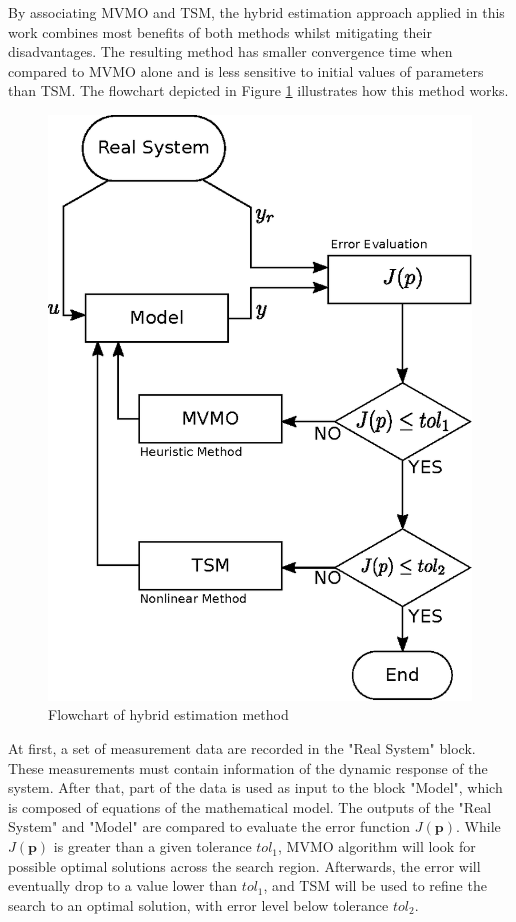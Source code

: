By associating MVMO and TSM, the hybrid estimation approach applied in this work combines most benefits of both methods whilst mitigating their disadvantages. The resulting method has smaller convergence time when compared to MVMO alone and is less sensitive to initial values of parameters than TSM. The flowchart depicted in Figure \ref{fig: flowchart} illustrates how this method works.

\begin{figure}[h]
	\caption{Flowchart of hybrid estimation method}
	\begin{center}
		\includegraphics[scale=0.7]{Images/Flowchart.eps}
	\end{center}
	\label{fig: flowchart}
\end{figure}

At first, a set of measurement data are recorded in the "Real System" block. These measurements must contain information of the dynamic response of the system. After that, part of the data is used as input to the block "Model", which is composed of equations of the mathematical model. The outputs of the "Real System" and "Model" are compared to evaluate the error function $J(\mathbf{p})$. While $J(\mathbf{p})$ is greater than a given tolerance $tol_{1}$, MVMO algorithm will look for possible optimal solutions across the search region. Afterwards, the error will eventually drop to a value lower than $tol_{1}$, and TSM will be used to refine the search to an optimal solution, with error level below tolerance $tol_{2}$.

